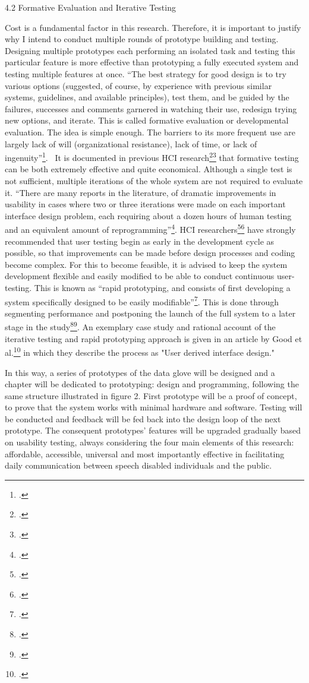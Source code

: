 4.2 Formative Evaluation and Iterative Testing

Cost is a fundamental factor in this research. Therefore, it is important to justify why I intend to conduct multiple rounds of prototype building and testing.  Designing multiple prototypes each performing an isolated task and testing this particular feature is more effective than prototyping a fully executed system and testing multiple features at once. 
 “The best strategy for good design is to try various options (suggested, of course, by experience with previous similar systems, guidelines, and available principles), test them, and be guided by the failures, successes and comments garnered in watching their use, redesign trying new options, and iterate. This is called formative evaluation or developmental evaluation. The idea is simple enough. The barriers to its more frequent use are largely lack of will (organizational resistance), lack of time, or lack of ingenuity”\footcite{Dix2004}. 
It is documented in previous HCI research\footcite{Cox2008}\footcite{Lazar2010} that formative testing can be both extremely effective and quite economical.  Although a single test is not sufficient, multiple iterations of the whole system are not required to evaluate it. “There are many reports in the literature, of dramatic improvements in usability in cases where two or three iterations were made on each important interface design problem, each requiring about a dozen hours of human testing and an equivalent amount of reprogramming”\footcite{Georges2004}.
HCI researchers\footcite{Cox2008}\footcite{Lazar2010} have strongly recommended that user testing begin as early in the development cycle as possible, so that improvements can be made before design processes and coding become complex. For this to become feasible, it is advised to keep the system development flexible and easily modified to be able to conduct continuous user-testing. This is known as “rapid prototyping, and consists of first developing a system specifically designed to be easily modifiable”\footcite{Wania2006}.  This is done through segmenting performance and postponing the launch of the full system to a later stage in the study\footcite{Dix2004}\footcite{Georges2004}.
An exemplary case study and rational account of the iterative testing and rapid prototyping approach is given in an article by Good et al.\footcite{Cox2008} in which they describe the process as "User derived interface design." 

In this way, a series of prototypes of the data glove will be designed and a chapter will be dedicated to prototyping: design and programming, following the same structure illustrated in figure 2.  First prototype will be a proof of concept, to prove that the system works with minimal hardware and software.  Testing will be conducted and feedback will be fed back into the design loop of the next prototype.  The consequent prototypes’ features will be upgraded gradually based on usability testing, always considering the four main elements of this research: affordable, accessible, universal and most importantly effective in facilitating daily communication between speech disabled individuals and the public. 

